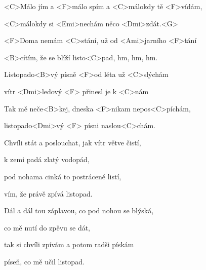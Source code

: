 

\zs
<C>Málo jím a <F>málo spím a <C>málokdy tě <F>vídám, 

<C>málokdy si <Emi>nechám něco <Dmi>zdát.<G> 

<F>Doma nemám <C>stání, už od <Ami>jarního <F>tání 

<B>cítím, že se blíží listo<C>pad, hm, hm, hm.
\ks

\zr
Listopado<B>vý písně <F>od léta už <C>slýchám 

vítr <Dmi>ledový <F> přinesl je k <C>nám 

Tak mě neče<B>kej, dneska <F>nikam nepos<C>píchám,

listopado<Dmi>vý <F> písni naslou<C>chám.
\kr

\zs
Chvíli stát a poslouchat, jak vítr větve čistí,

k zemi padá zlatý vodopád,

pod nohama cinká to postrácené listí,

vím, že právě zpívá listopad.
\ks

\zr

\kr

\zs
Dál a dál tou záplavou, co pod nohou se blýská,

co mě nutí do zpěvu se dát,

tak si chvíli zpívám a potom radši pískám

píseň, co mě učil listopad.
\ks

\zr
\kr

\kp
